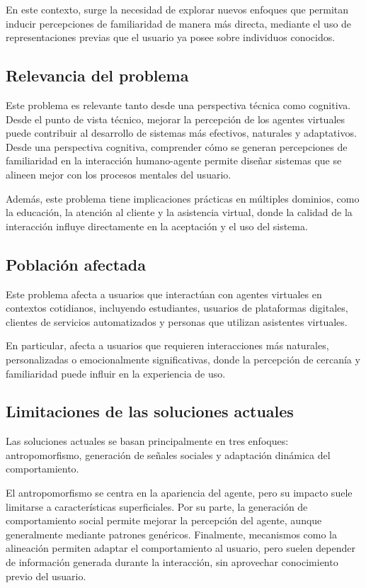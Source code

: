 \documentclass[12pt]{article}
\begin{document}
En este contexto, surge la necesidad de explorar nuevos enfoques que permitan inducir percepciones de familiaridad de manera más directa, mediante el uso de representaciones previas que el usuario ya posee sobre individuos conocidos.

\subsection{Relevancia del problema}

Este problema es relevante tanto desde una perspectiva técnica como cognitiva. Desde el punto de vista técnico, mejorar la percepción de los agentes virtuales puede contribuir al desarrollo de sistemas más efectivos, naturales y adaptativos. Desde una perspectiva cognitiva, comprender cómo se generan percepciones de familiaridad en la interacción humano-agente permite diseñar sistemas que se alineen mejor con los procesos mentales del usuario.

Además, este problema tiene implicaciones prácticas en múltiples dominios, como la educación, la atención al cliente y la asistencia virtual, donde la calidad de la interacción influye directamente en la aceptación y el uso del sistema.

\subsection{Población afectada}

Este problema afecta a usuarios que interactúan con agentes virtuales en contextos cotidianos, incluyendo estudiantes, usuarios de plataformas digitales, clientes de servicios automatizados y personas que utilizan asistentes virtuales.

En particular, afecta a usuarios que requieren interacciones más naturales, personalizadas o emocionalmente significativas, donde la percepción de cercanía y familiaridad puede influir en la experiencia de uso.

\subsection{Limitaciones de las soluciones actuales}

Las soluciones actuales se basan principalmente en tres enfoques: antropomorfismo, generación de señales sociales y adaptación dinámica del comportamiento.

El antropomorfismo se centra en la apariencia del agente, pero su impacto suele limitarse a características superficiales. Por su parte, la generación de comportamiento social permite mejorar la percepción del agente, aunque generalmente mediante patrones genéricos. Finalmente, mecanismos como la alineación permiten adaptar el comportamiento al usuario, pero suelen depender de información generada durante la interacción, sin aprovechar conocimiento previo del usuario.
\end{document}
